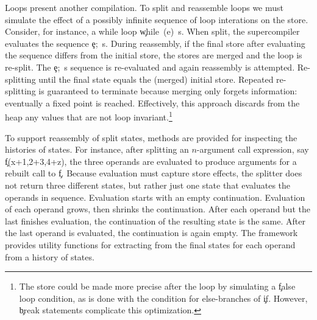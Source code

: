 Loops present another compilation.
To split and reassemble loops we must simulate the effect of a possibly
infinite sequence of loop interations on the store.
Consider, for instance, a while loop \c{while~(e)~s}.
When split, the supercompiler 
evaluates the sequence \c{e;~s}. During reassembly, if the final store after evaluating the sequence differs from
the initial store, the stores are merged and the loop is re-split.
The \c{e;~s} sequence is re-evaluated and again
reassembly is attempted. Re-splitting until the final state equals the (merged) initial store.
Repeated re-splitting is guaranteed to terminate because merging only forgets
information: eventually a fixed point is reached. Effectively, this approach discards from the heap any values
that are not loop invariant.\footnote{The store could be made more precise after
the loop by simulating a \c{false} loop condition, as is done
with the condition for else-branches of \c{if}. However, \c{break} statements complicate this optimization.}

To support reassembly of split states, methods are provided for inspecting the
histories of states. For instance, after splitting an $n$-argument call expression,
say \c{f(x+1,2+3,4+z)}, the three operands are evaluated to produce arguments for 
a rebuilt call to \c{f}.
Because evaluation must capture store effects, the splitter does not return
three different states, but rather just one state that evaluates the operands
in sequence. Evaluation starts with an empty continuation.
Evaluation of each operand grows, then shrinks the continuation. 
After each operand but the last finishes evaluation, the continuation of the resulting state is
the same. After the last operand is evaluated, the continuation is again empty.
The framework provides utility functions for extracting from the final states for each operand
from a history of states.


